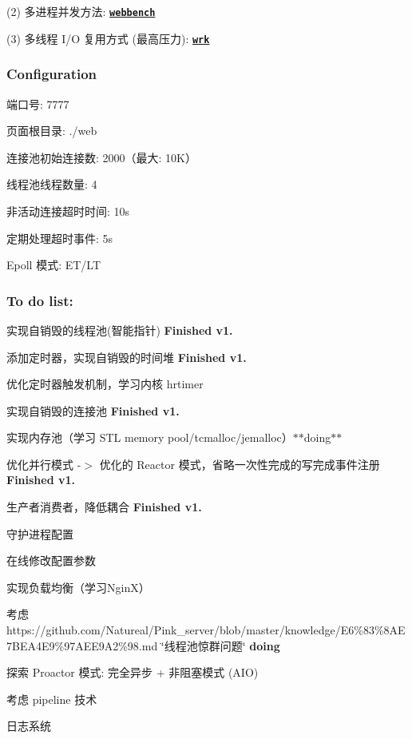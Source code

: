 (2) 多进程并发方法\+: {\bfseries \href{http://home.tiscali.cz/~cz210552/webbench.html}{\tt webbench}}

(3) 多线程 I/O 复用方式 (最高压力)\+: {\bfseries \href{https://github.com/wg/wrk}{\tt wrk}} 



\subsubsection*{Configuration}


\begin{DoxyItemize}
\item 端口号\+: 7777
\item 页面根目录\+: ./web
\item 连接池初始连接数\+: 2000（最大\+: 10\+K）
\item 线程池线程数量\+: 4
\item 非活动连接超时时间\+: 10s
\item 定期处理超时事件\+: 5s
\item Epoll 模式\+: E\+T/\+LT 


\end{DoxyItemize}

\subsubsection*{To do list\+:}


\begin{DoxyEnumerate}
\item 实现自销毁的线程池(智能指针) {\bfseries Finished v1.}
\item 添加定时器，实现自销毁的时间堆 {\bfseries Finished v1.}
\item 优化定时器触发机制，学习内核 hrtimer
\item 实现自销毁的连接池 {\bfseries Finished v1.}
\item 实现内存池（学习 S\+TL memory pool/tcmalloc/jemalloc）$\ast$$\ast$doing$\ast$$\ast$
\item 优化并行模式 -\/$>$ 优化的 Reactor 模式，省略一次性完成的写完成事件注册 {\bfseries Finished v1.}
\item 生产者消费者，降低耦合 {\bfseries Finished v1.}
\item 守护进程配置
\item 在线修改配置参数
\item 实现负载均衡（学习\+Ngin\+X）
\item 考虑https\+://github.com/\+Natureal/\+Pink\+\_\+server/blob/master/knowledge/E6\%83\%8AE7BEA4E9\%97AEE9A2\%98.\+md \char`\"{}线程池惊群问题\char`\"{} {\bfseries doing}
\item 探索 Proactor 模式\+: 完全异步 + 非阻塞模式 (A\+IO)
\item 考虑 pipeline 技术
\item 日志系统 
\end{DoxyEnumerate}